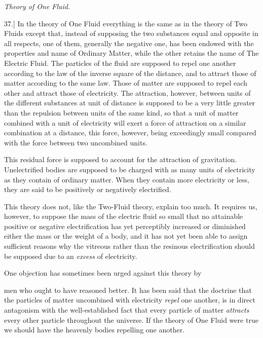 \documentclass[11pt,a4paper]{article}
\begin{document}
\begin{center}
\textit{Theory of One Fluid.}
\end{center}

37.] In the theory of One Fluid everything is the same as in the theory
of Two Fluids except that, instead of supposing the two substances equal
and opposite in all respects, one of them, generally the negative one,
has been endowed with the properties and name of Ordinary Matter, while
the other retains the name of The Electric Fluid. The particles of the
fluid are supposed to repel one another according to the law of the
inverse square of the distance, and to attract those of matter according
to the same law. Those of matter are supposed to repel each other and
attract those of electricity. The attraction, however, between units of
the different substances at unit of distance is supposed to be a very
little greater than the repulsion between units of the same kind, so
that a unit of matter combined with a unit of electricity will exert a
force of attraction on a similar combination at a distance, this force,
however, being exceedingly small compared with the force between two
uncombined units.

This residual force is supposed to account for the attraction of
gravitation. Unelectrified bodies are supposed to be charged with as
many units of electricity as they contain of ordinary matter. When they
contain more electricity or less, they are said to be positively or
negatively electrified.

This theory does not, like the Two-Fluid theory, explain too much. It
requires us, however, to suppose the mass of the electric fluid so small
that no attainable positive or negative electrification has yet
perceptibly increased or diminished either the mass or the weight of a
body, and it has not yet been able to assign sufficient reasons why the
vitreous rather than the resinous electrification should be supposed due
to an \textit{excess} of electricity.

One objection has sometimes been urged against this theory by

\clearpage
\setcounter{footnote}{0}

men who ought to have reasoned better. It has been said that the
doctrine that the particles of matter uncombined with electricity
\textit{repel} one another, is in direct antagonism with the
well-established fact that every particle of matter \textit{attracts}
every other particle throughout the universe. If the theory of One Fluid
were true we should have the heavenly bodies repelling one another.
\end{document}
